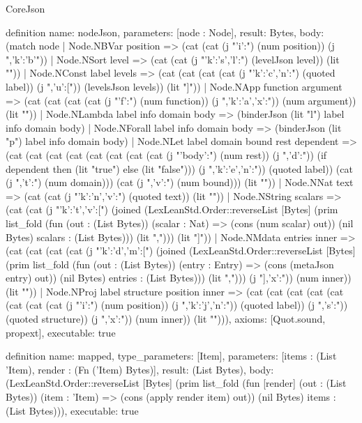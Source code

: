 \begin{lexlean}{CoreJson}
\begin{semanticmodule}
definition{
  name: nodeJson,
  parameters: [node : Node],
  result: Bytes,
  body: (match node
    | Node.NBVar position => (cat (cat (j "{'i':") (num position)) (j ",'k':'b'}"))
    | Node.NSort level => (cat (cat (j "{'k':'s','l':") (levelJson level)) (lit "}"))
    | Node.NConst label levels => (cat (cat (cat (cat (j "{'k':'c','n':") (quoted label)) (j ",'u':[")) (levelsJson levels)) (lit "]}"))
    | Node.NApp function argument => (cat (cat (cat (cat (j "{'f':") (num function)) (j ",'k':'a','x':")) (num argument)) (lit "}"))
    | Node.NLambda label info domain body => (binderJson (lit "l") label info domain body)
    | Node.NForall label info domain body => (binderJson (lit "p") label info domain body)
    | Node.NLet label domain bound rest dependent => (cat (cat (cat (cat (cat (cat (cat (cat (j "{'body':") (num rest)) (j ",'d':")) (if dependent then (lit "true") else (lit "false"))) (j ",'k':'e','n':")) (quoted label)) (cat (j ",'t':") (num domain))) (cat (j ",'v':") (num bound))) (lit "}"))
    | Node.NNat text => (cat (cat (j "{'k':'n','v':") (quoted text)) (lit "}"))
    | Node.NString scalars => (cat (cat (j "{'k':'t','v':[") (joined (LexLeanStd.Order::reverseList [Bytes] (prim list_fold (fun (out : (List Bytes)) (scalar : Nat) => (cons (num scalar) out)) (nil Bytes) scalars : (List Bytes))) (lit ","))) (lit "]}"))
    | Node.NMdata entries inner => (cat (cat (cat (cat (j "{'k':'d','m':[") (joined (LexLeanStd.Order::reverseList [Bytes] (prim list_fold (fun (out : (List Bytes)) (entry : Entry) => (cons (metaJson entry) out)) (nil Bytes) entries : (List Bytes))) (lit ","))) (j "],'x':")) (num inner)) (lit "}"))
    | Node.NProj label structure position inner => (cat (cat (cat (cat (cat (cat (cat (cat (j "{'i':") (num position)) (j ",'k':'j','n':")) (quoted label)) (j ",'s':")) (quoted structure)) (j ",'x':")) (num inner)) (lit "}"))),
  axioms: [Quot.sound, propext],
  executable: true
}

definition{
  name: mapped,
  type_parameters: [Item],
  parameters: [items : (List 'Item), render : (Fn ('Item) Bytes)],
  result: (List Bytes),
  body: (LexLeanStd.Order::reverseList [Bytes] (prim list_fold (fun [render] (out : (List Bytes)) (item : 'Item) => (cons (apply render item) out)) (nil Bytes) items : (List Bytes))),
  executable: true
}


\end{semanticmodule}
\end{lexlean}
